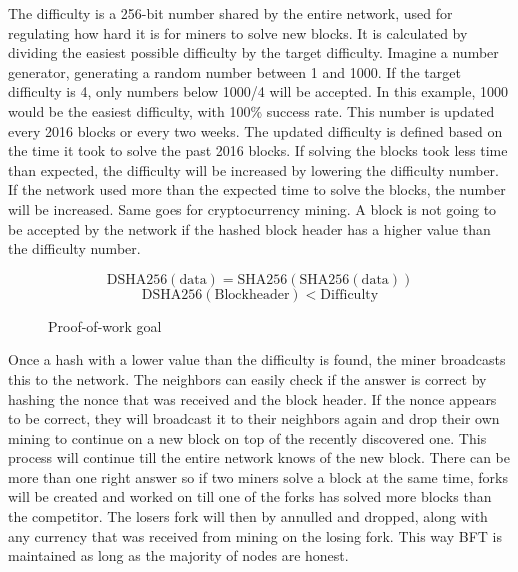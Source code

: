 \documentclass[11pt]{article}
\begin{document}
The difficulty is a 256-bit number shared by the entire network, used for regulating how hard it is for miners to solve new blocks. It is calculated by dividing the easiest possible difficulty by the target difficulty. Imagine a number generator, generating a random number between 1 and 1000. If the target difficulty is 4, only numbers below 1000/4 will be accepted. In this example, 1000 would be the easiest difficulty, with 100\% success rate. This number is updated every 2016 blocks or every two weeks. The updated difficulty is defined based on the time it took to solve the past 2016 blocks. If solving the blocks took less time than expected, the difficulty will be increased by lowering the difficulty number. If the network used more than the expected time to solve the blocks, the number will be increased. Same goes for cryptocurrency mining. A block is not going to be accepted by the network if the hashed block header has a higher value than the difficulty number. 

\begin{figure}[h!]
\begin{equation*}
\textrm{DSHA256}(\textrm{data}) = \textrm{SHA256}(\textrm{SHA256}(\textrm{data}))
\end{equation*}
\begin{equation*}
\textrm{DSHA256}(\textrm{Blockheader}) < \textrm{Difficulty}
\end{equation*}
\caption{Proof-of-work goal}
\end{figure}

Once a hash with a lower value than the difficulty is found, the miner broadcasts this to the network. The neighbors can easily check if the answer is correct by hashing the nonce that was received and the block header. If the nonce appears to be correct, they will broadcast it to their neighbors again and drop their own mining to continue on a new block on top of the recently discovered one. This process will continue till the entire network knows of the new block. There can be more than one right answer so if two miners solve a block at the same time, forks will be created and worked on till one of the forks has solved more blocks than the competitor. The losers fork will then by annulled and dropped, along with any currency that was received from mining on the losing fork. This way BFT is maintained as long as the majority of nodes are honest.
\end{document}
